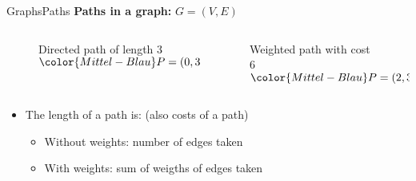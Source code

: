 
\begin{frame}{Graphs}{Paths}
  \textbf{Paths in a graph:}
         {\color{Mittel-Blau}$G = (V , E)$}
  \begin{columns}
    \begin{column}[b]{0.5\linewidth}
      \begin{figure}
        \begin{adjustbox}{width=0.95\linewidth}
          
        \end{adjustbox}
        \caption{{\color{Mittel-Blau}Directed path} of length 3 \newline
          ${\color{Mittel-Blau}P} = (0, 3, 1, 4)$}
        \label{fig:graphs:directed_path_length}
      \end{figure}
    \end{column}
    \begin{column}[b]{0.5\linewidth}
      \begin{figure}
        \begin{adjustbox}{width=0.8\linewidth}
          
        \end{adjustbox}
        \caption{{\color{Mittel-Blau}Weighted path} with cost 6 \newline
          ${\color{Mittel-Blau}P} = (2, 3, 1)$}
        \label{fig:graphs:weighted_path_length}
      \end{figure}
    \end{column}
  \end{columns}
  \begin{itemize}
    \item<4->
      The {\color{Mittel-Blau}length of a path} is:
      (also costs of a path)
      \begin{itemize}
        \item<5->
          Without weights:
          {\color{Mittel-Blau}number of edges} taken
        \item<6->
          With weights:
          {\color{Mittel-Blau}sum of weigths of edges} taken
      \end{itemize}
  \end{itemize}
\end{frame}


